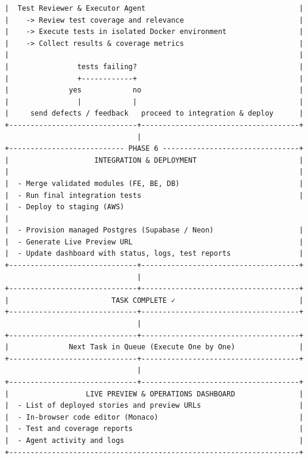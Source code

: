 \documentclass[11pt,a4paper]{article}
\begin{document}
\begin{center}
\begin{lstlisting}
|  Test Reviewer & Executor Agent                                    |
|    -> Review test coverage and relevance                           |
|    -> Execute tests in isolated Docker environment                 |
|    -> Collect results & coverage metrics                           |
|                                                                    |
|                tests failing?                                      |
|                +------------+                                      |
|              yes            no                                     |
|                |            |                                      |
|     send defects / feedback   proceed to integration & deploy      |
+------------------------------+-------------------------------------+
                               |
+--------------------------- PHASE 6 --------------------------------+
|                    INTEGRATION & DEPLOYMENT                        |
|                                                                    |
|  - Merge validated modules (FE, BE, DB)                            |
|  - Run final integration tests                                     |
|  - Deploy to staging (AWS)                                          |
|  - Provision managed Postgres (Supabase / Neon)                    |
|  - Generate Live Preview URL                                       |
|  - Update dashboard with status, logs, test reports                |
+------------------------------+-------------------------------------+
                               |
+------------------------------+-------------------------------------+
|                        TASK COMPLETE ✓                             |
+------------------------------+-------------------------------------+
                               |
+------------------------------+-------------------------------------+
|              Next Task in Queue (Execute One by One)               |
+------------------------------+-------------------------------------+
                               |
+------------------------------+-------------------------------------+
|                  LIVE PREVIEW & OPERATIONS DASHBOARD               |
|  - List of deployed stories and preview URLs                       |
|  - In-browser code editor (Monaco)                                 |
|  - Test and coverage reports                                       |
|  - Agent activity and logs                                         |
+--------------------------------------------------------------------+
\end{lstlisting}
\end{center}
\end{document}
